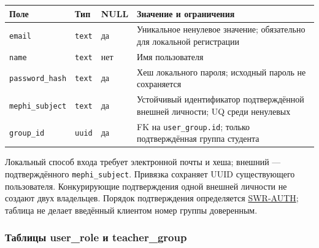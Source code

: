 \documentclass[12pt,a4paper]{article}
\newcounter{none} %
\begin{document}
{\def\LTcaptype{none} %
\begin{longtable}[]{@{}
  >{\raggedright\arraybackslash}p{}
  >{\raggedright\arraybackslash}p{}
  >{\raggedright\arraybackslash}p{}
  >{\raggedright\arraybackslash}p{}@{}}
\toprule\noalign{}
\begin{minipage}[b]{\linewidth}\raggedright
Поле
\end{minipage} & \begin{minipage}[b]{\linewidth}\raggedright
Тип
\end{minipage} & \begin{minipage}[b]{\linewidth}\raggedright
NULL
\end{minipage} & \begin{minipage}[b]{\linewidth}\raggedright
Значение и ограничения
\end{minipage} \\
\midrule\noalign{}
\endhead
\bottomrule\noalign{}
\endlastfoot
\texttt{email} & \texttt{text} & да & Уникальное ненулевое значение; обязательно для локальной регистрации \\
\texttt{name} & \texttt{text} & нет & Имя пользователя \\
\texttt{password\_\allowbreak{}hash} & \texttt{text} & да & Хеш локального пароля; исходный пароль не сохраняется \\
\texttt{mephi\_\allowbreak{}subject} & \texttt{text} & да & Устойчивый идентификатор подтверждённой внешней личности; UQ среди ненулевых \\
\texttt{group\_id} & \texttt{uuid} & да & FK на \texttt{user\_\allowbreak{}group.\allowbreak{}id}; только подтверждённая группа студента \\
\end{longtable}
}

Локальный способ входа требует электронной почты и хеша; внешний --- подтверждённого \texttt{mephi\_\allowbreak{}subject}. Привязка сохраняет UUID существующего пользователя. Конкурирующие подтверждения одной внешней личности не создают двух владельцев. Порядок подтверждения определяется {\hyperlink{учётная-запись-и-доступ}{SWR-AUTH}}; таблица не делает введённый клиентом номер группы доверенным.

\subsubsection{Таблицы user\_role и teacher\_group}\label{ux442ux430ux431ux43bux438ux446ux44b-user_role-ux438-teacher_group}
\end{document}
